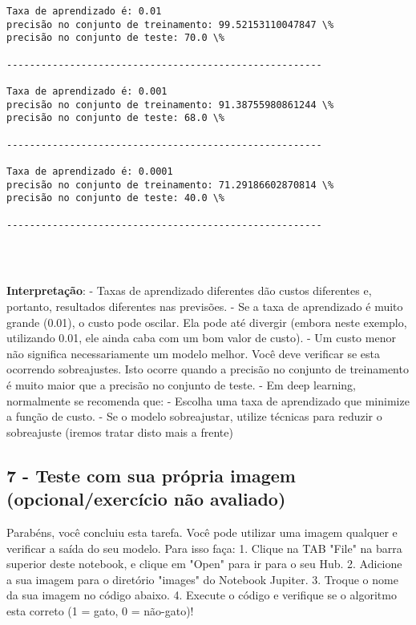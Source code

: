 \documentclass[11pt]{article}
\begin{document}
    \begin{Verbatim}[commandchars=\\\{\}]
Taxa de aprendizado é: 0.01
precisão no conjunto de treinamento: 99.52153110047847 \%
precisão no conjunto de teste: 70.0 \%

-------------------------------------------------------

Taxa de aprendizado é: 0.001
precisão no conjunto de treinamento: 91.38755980861244 \%
precisão no conjunto de teste: 68.0 \%

-------------------------------------------------------

Taxa de aprendizado é: 0.0001
precisão no conjunto de treinamento: 71.29186602870814 \%
precisão no conjunto de teste: 40.0 \%

-------------------------------------------------------


    \end{Verbatim}

    \begin{center}
    \end{center}
    { \hspace*{\fill} \\}
    
    \textbf{Interpretação}: - Taxas de aprendizado diferentes dão custos
diferentes e, portanto, resultados diferentes nas previsões. - Se a taxa
de aprendizado é muito grande (0.01), o custo pode oscilar. Ela pode até
divergir (embora neste exemplo, utilizando 0.01, ele ainda caba com um
bom valor de custo). - Um custo menor não significa necessariamente um
modelo melhor. Você deve verificar se esta ocorrendo sobreajustes. Isto
ocorre quando a precisão no conjunto de treinamento é muito maior que a
precisão no conjunto de teste. - Em deep learning, normalmente se
recomenda que: - Escolha uma taxa de aprendizado que minimize a função
de custo. - Se o modelo sobreajustar, utilize técnicas para reduzir o
sobreajuste (iremos tratar disto mais a frente)

    \subsection{7 - Teste com sua própria imagem (opcional/exercício não
avaliado)}\label{teste-com-sua-pruxf3pria-imagem-opcionalexercuxedcio-nuxe3o-avaliado}

Parabéns, você concluiu esta tarefa. Você pode utilizar uma imagem
qualquer e verificar a saída do seu modelo. Para isso faça: 1. Clique na
TAB "File" na barra superior deste notebook, e clique em "Open" para ir
para o seu Hub. 2. Adicione a sua imagem para o diretório "images" do
Notebook Jupiter. 3. Troque o nome da sua imagem no código abaixo. 4.
Execute o código e verifique se o algoritmo esta correto (1 = gato, 0 =
não-gato)!
\end{document}
